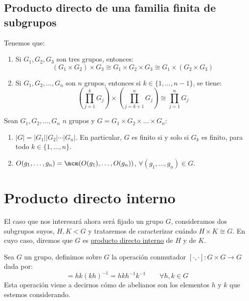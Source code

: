 \subsection{Producto directo de una familia finita de subgrupos}

\begin{teo}
    Tenemos que:
    \begin{enumerate}
        \item Si $G_1,G_2,G_3$ son tres grupos, entonces:
            \begin{equation*}
                (G_1\times G_2) \times G_3 \cong G_1 \times G_2 \times G_3 \cong G_1\times (G_2\times G_3)
            \end{equation*}
        \item Si $G_1,G_2,\ldots,G_n$ son $n$ grupos, entonces si $k\in \{1,\ldots,n-1\}$, se tiene:
            \begin{equation*}
                \left(\prod_{j=1}^{k}G_j\right) \times \left(\prod_{j=k+1}^{n}G_j\right) \cong \prod_{j=1}^{n}G_j
            \end{equation*}
    \end{enumerate}
\end{teo}

\begin{teo}
    Sean $G_1,G_2,\ldots,G_n$ $n$ grupos y $G = G_1\times G_2 \times \ldots \times G_n$:
    \begin{enumerate}
        \item $|G| = |G_1| |G_2| \cdots |G_n| $. En particular, $G$ es finito si y solo si $G_k$ es finito, para todo $k\in \{1,\ldots,n\}$.
        \item $O(g_1,\ldots,g_n) = \mcm(O(g_1), \ldots, O(g_n))$, $\forall (g_1,\ldots,g_n)\in G$.
    \end{enumerate}
\end{teo}

\section{Producto directo interno}
El caso que nos interesará ahora será fijado un grupo $G$, consideramos dos subgrupos suyos, $H,K<G$ y trataremos de caracterizar cuándo $H\times K \cong G$. En cuyo caso, diremos que $G$ es \underline{producto directo interno} de $H$ y de $K$.

\begin{definicion}[Conmutador]
    Sea $G$ un grupo, definimos sobre $G$ la operación conmutador $[\cdot ,\cdot ]:G\times G \to G$ dada por:
    \begin{equation*}
        [h,k] = hk{(kh)}^{-1} = hkh^{-1}k^{-1}  \qquad \forall h,k\in G
    \end{equation*}
    Esta operación viene a decirnos cómo de abelianos son los elementos $h$ y $k$ que estemos considerando.
\end{definicion}

